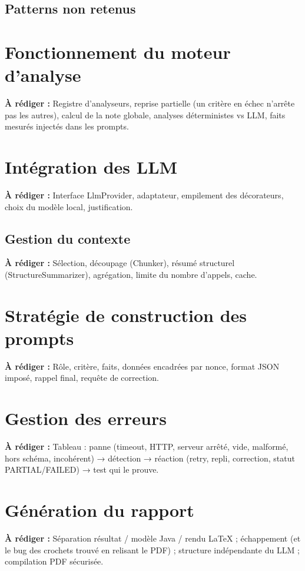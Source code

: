 \documentclass[11pt,a4paper]{report}
\newcommand{\todo}[1]{\par\noindent\colorbox{yellow!30}{\parbox{\dimexpr\linewidth-2\fboxsep}{\textbf{À rédiger :} #1}}\par}
\begin{document}
\section{Patterns non retenus} %

\chapter{Fonctionnement du moteur d'analyse}              %
\todo{Registre d'analyseurs, reprise partielle (un critère en échec n'arrête pas les autres), calcul de la note globale, analyses déterministes vs LLM, faits mesurés injectés dans les prompts.}

\chapter{Intégration des LLM}                             %
\todo{Interface LlmProvider, adaptateur, empilement des décorateurs, choix du modèle local, justification.}

\section{Gestion du contexte}                             %
\todo{Sélection, découpage (Chunker), résumé structurel (StructureSummarizer), agrégation, limite du nombre d'appels, cache.}

\chapter{Stratégie de construction des prompts}           %
\todo{Rôle, critère, faits, données encadrées par nonce, format JSON imposé, rappel final, requête de correction.}

\chapter{Gestion des erreurs}                             %
\todo{Tableau : panne (timeout, HTTP, serveur arrêté, vide, malformé, hors schéma, incohérent) → détection → réaction (retry, repli, correction, statut PARTIAL/FAILED) → test qui le prouve.}

\chapter{Génération du rapport}                           %
\todo{Séparation résultat / modèle Java / rendu LaTeX ; échappement (et le bug des crochets trouvé en relisant le PDF) ; structure indépendante du LLM ; compilation PDF sécurisée.}
\end{document}
